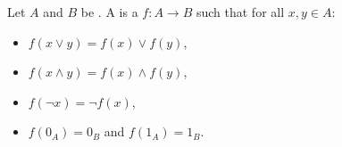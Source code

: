 \begin{definition} \label{definition:morphism_of_boolean_algebras}
Let $A$ and $B$ be . A  is a  $f: A \to B$ such that for all $x, y \in A$:
\begin{itemize}
    \item $f(x \lor y) = f(x) \lor f(y)$,
    \item $f(x \land y) = f(x) \land f(y)$,
    \item $f(\neg x) = \neg f(x)$,
    \item $f(0_A) = 0_B$ and $f(1_A) = 1_B$.
\end{itemize}
\end{definition}